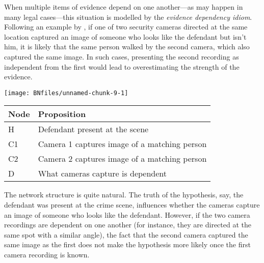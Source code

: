 \documentclass{article}
\begin{document}



When multiple items of evidence depend on one another---as may happen in many legal cases---this situation is modelled by the \textit{evidence dependency idiom}. Following an example by \cite{Fenton2018Risk}, if one of two security cameras directed at the same location captured an image of someone who looks like the defendant but isn't him, it is likely that the same person walked by the second camera, which also captured the same image. In such cases, presenting the second recording as independent from the first would lead to overestimating the strength of the evidence.   %

\begin{center}\texttt{[image: BNfiles/unnamed-chunk-9-1]} \end{center}

\begin{center}
\begin{tabular}{@{}lp{7.5cm}@{}}
\toprule
Node &  Proposition\\
\midrule
H &  Defendant present at the scene \\
C1 & Camera 1 captures image of a matching person \\
C2 & Camera 2 captures image of a matching person\\
D &  What cameras capture is dependent \\
\bottomrule
\end{tabular}
\end{center}


\noindent The network structure is quite natural. The truth of the hypothesis, say, the defendant was present at the crime scene, influences whether the cameras capture an image of someone who looks like the defendant. However, if the two camera recordings are dependent on one another (for instance, they are directed at the same spot with a similar angle), the fact that the second camera captured the same image as the first does not make the hypothesis more likely once the first camera recording is known.
\end{document}

